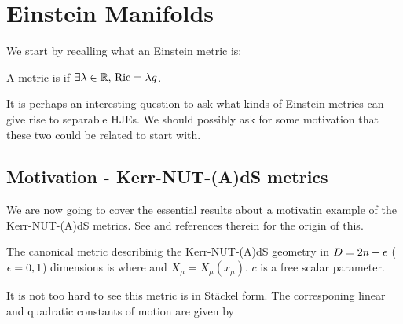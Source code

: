 \documentclass{article}
\begin{document}
\section{Einstein Manifolds}

We start by recalling what an Einstein metric is:

\begin{definition}
A metric is  if $\exists \lambda \in \mathbb{R}, \, \operatorname{Ric} = \lambda g$. 
\end{definition}

It is perhaps an interesting question to ask what kinds of Einstein metrics can give rise to separable HJEs. We should possibly ask for some motivation that these two could be related to start with. 

\subsection{Motivation - Kerr-NUT-(A)dS metrics}
We are now going to cover the essential results about a motivatin example of the Kerr-NUT-(A)dS metrics. See \cite{Frolov2017} and references therein for the origin of this.

\begin{definition}
	The canonical metric describinig the Kerr-NUT-(A)dS geometry in $D=2n+\epsilon$ ($\epsilon=0,1$) dimensions is 
where 
and $X_\mu = X_\mu(x_\mu)$. $c$ is a free scalar parameter. 
\end{definition}

It is not too hard to see this metric is in St\"ackel form. The corresponing linear and quadratic constants of motion are given by 
\end{document}
